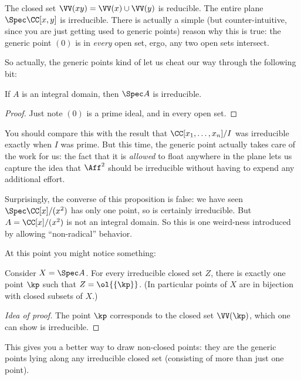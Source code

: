 \begin{example}
	\listhack
	\begin{enumerate}[(a)]
		\ii The closed set $\VV(xy) = \VV(x) \cup \VV(y)$ is reducible.
		\ii The entire plane $\Spec \CC[x,y]$ is irreducible.
		There is actually a simple (but counter-intuitive,
		since you are just getting used to generic points)
		reason why this is true:
		the generic point $(0)$ is in \emph{every} open set,
		ergo, any two open sets intersect.
	\end{enumerate}
\end{example}

So actually, the generic points
kind of let us cheat our way through the following bit:
\begin{proposition}
	If $A$ is an integral domain,
	then $\Spec A$ is irreducible.
\end{proposition}
\begin{proof}
	Just note $(0)$ is a prime ideal,
	and in every open set.
\end{proof}
You should compare this with the result that $\CC[x_1, \dots, x_n]/I$
was irreducible exactly when $I$ was prime.
But this time, the generic point actually takes care
of the work for us:
the fact that it is \emph{allowed} to float
anywhere in the plane lets us capture the idea that
$\Aff^2$ should be irreducible
without having to expend any additional effort.
\begin{remark}
	Surprisingly, the converse of this proposition is false:
	we have seen $\Spec \CC[x]/(x^2)$ has only one point,
	so is certainly irreducible.
	But $A = \CC[x]/(x^2)$ is not an integral domain.
	So this is one weird-ness introduced by allowing ``non-radical'' behavior.
\end{remark}

At this point you might notice something:
\begin{theorem}
	Consider $X = \Spec A$.
	For every irreducible closed set $Z$,
	there is exactly one point $\kp$ such that $Z = \ol{\{\kp\}}$.
	(In particular points of $X$ are in bijection
	with closed subsets of $X$.)
\end{theorem}
\begin{proof}
	[Idea of proof]
	The point $\kp$ corresponds to the closed set $\VV(\kp)$,
	which one can show is irreducible.
\end{proof}
This gives you a better way to draw non-closed points:
they are the generic points lying along any irreducible closed set
(consisting of more than just one point).

